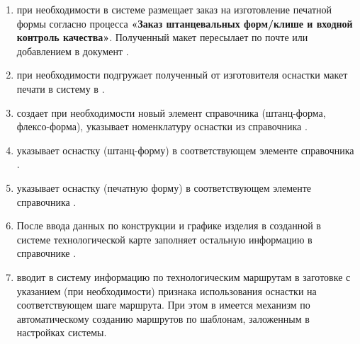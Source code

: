 \begin{enumerate}
\item \constructor при необходимости в системе \gofro размещает заказ на изготовление печатной формы согласно процесса \textbf{«Заказ штанцевальных форм/клише и входной контроль качества»}. Полученный макет \constructor пересылает \tehnolog по почте или добавлением в документ . 


\item \tehnolog при необходимости подгружает полученный от изготовителя оснастки макет печати в систему \gofro в .





\item	\constructor создает при необходимости новый элемент справочника  (штанц-форма, флексо-форма), указывает номенклатуру оснастки из справочника . 
\item	\tehnolog  указывает оснастку (штанц-форму) в соответствующем элементе справочника . 
\item \tehnolog  указывает оснастку (печатную форму) в соответствующем элементе справочника .
\item	После ввода данных по конструкции и графике изделия в созданной в системе \gofro технологической карте \tehnolog заполняет остальную информацию в справочнике .
\item	\tehnolog  вводит в систему \gofro информацию по технологическим маршрутам в заготовке   с указанием (при необходимости) признака использования оснастки на соответствующем шаге маршрута. При этом в \gofro имеется механизм по автоматическому созданию маршрутов по шаблонам, заложенным в настройках системы.


\end{enumerate}
